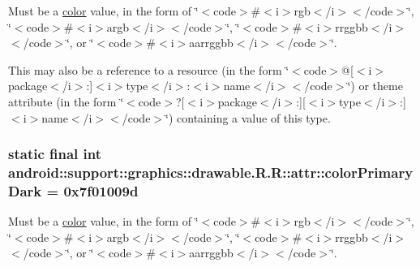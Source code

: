 Must be a \hyperlink{classandroid_1_1support_1_1graphics_1_1drawable_1_1_r_1_1color}{color} value, in the form of \char`\"{}$<$code$>$\#$<$i$>$rgb$<$/i$>$$<$/code$>$\char`\"{}, \char`\"{}$<$code$>$\#$<$i$>$argb$<$/i$>$$<$/code$>$\char`\"{}, \char`\"{}$<$code$>$\#$<$i$>$rrggbb$<$/i$>$$<$/code$>$\char`\"{}, or \char`\"{}$<$code$>$\#$<$i$>$aarrggbb$<$/i$>$$<$/code$>$\char`\"{}. 

This may also be a reference to a resource (in the form \char`\"{}$<$code$>$@\mbox{[}$<$i$>$package$<$/i$>$:\mbox{]}$<$i$>$type$<$/i$>$:$<$i$>$name$<$/i$>$$<$/code$>$\char`\"{}) or theme attribute (in the form \char`\"{}$<$code$>$?\mbox{[}$<$i$>$package$<$/i$>$:\mbox{]}\mbox{[}$<$i$>$type$<$/i$>$:\mbox{]}$<$i$>$name$<$/i$>$$<$/code$>$\char`\"{}) containing a value of this type. \hypertarget{classandroid_1_1support_1_1graphics_1_1drawable_1_1_r_1_1attr_23da7468b32ff7a3a5177fdf1a903547}{
\subsubsection[{colorPrimaryDark}]{\setlength{\rightskip}{0pt plus 5cm}static final int android::support::graphics::drawable.R.R::attr::colorPrimaryDark = 0x7f01009d}}
\label{classandroid_1_1support_1_1graphics_1_1drawable_1_1_r_1_1attr_23da7468b32ff7a3a5177fdf1a903547}


Must be a \hyperlink{classandroid_1_1support_1_1graphics_1_1drawable_1_1_r_1_1color}{color} value, in the form of \char`\"{}$<$code$>$\#$<$i$>$rgb$<$/i$>$$<$/code$>$\char`\"{}, \char`\"{}$<$code$>$\#$<$i$>$argb$<$/i$>$$<$/code$>$\char`\"{}, \char`\"{}$<$code$>$\#$<$i$>$rrggbb$<$/i$>$$<$/code$>$\char`\"{}, or \char`\"{}$<$code$>$\#$<$i$>$aarrggbb$<$/i$>$$<$/code$>$\char`\"{}. 

